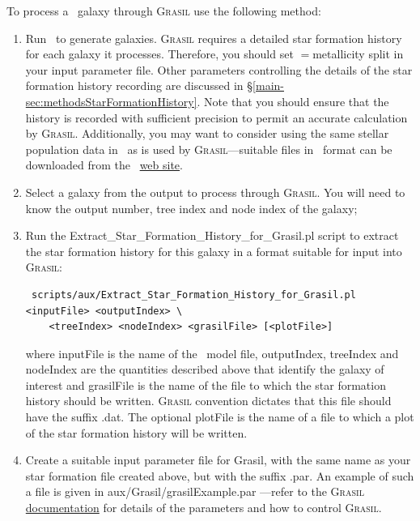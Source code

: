 To process a \glc\ galaxy through {\normalfont \scshape Grasil} use the following method:
\begin{enumerate}
 \item Run \glc\ to generate galaxies. {\normalfont \scshape Grasil} requires a detailed star formation history for each galaxy it processes. Therefore, you should set {\normalfont \ttfamily [starFormationHistoriesMethod]}$=${\normalfont \ttfamily metallicity split} in your input parameter file. Other parameters controlling the details of the star formation history recording are discussed in \S\ref{main-sec:methodsStarFormationHistory}. Note that you should ensure that the history is recorded with sufficient precision to permit an accurate calculation by {\normalfont \scshape Grasil}. Additionally, you may want to consider using the same stellar population data in \glc\ as is used by {\normalfont \scshape Grasil}---suitable files in \glc\ format can be downloaded from the \glc\ \href{https://sites.google.com/site/galacticusmodel/home/auxiliary-data}{web site}.
 \item Select a galaxy from the output to process through {\normalfont \scshape Grasil}. You will need to know the output number, tree index and node index of the galaxy;
 \item Run the {\normalfont \ttfamily Extract\_Star\_Formation\_History\_for\_Grasil.pl} script to extract the star formation history for this galaxy in a format suitable for input into {\normalfont \scshape Grasil}:
\begin{verbatim}
 scripts/aux/Extract_Star_Formation_History_for_Grasil.pl <inputFile> <outputIndex> \
    <treeIndex> <nodeIndex> <grasilFile> [<plotFile>]
\end{verbatim}
where {\normalfont \ttfamily inputFile} is the name of the \glc\ model file, {\normalfont \ttfamily outputIndex}, {\normalfont \ttfamily treeIndex} and {\normalfont \ttfamily nodeIndex} are the quantities described above that identify the galaxy of interest and {\normalfont \ttfamily grasilFile} is the name of the file to which the star formation history should be written. {\normalfont \scshape Grasil} convention dictates that this file should have the suffix {\normalfont \ttfamily .dat}. The optional {\normalfont \ttfamily plotFile} is the name of a file to which a plot of the star formation history will be written.
 \item Create a suitable input parameter file for {\normalfont \ttfamily Grasil}, with the same name as your star formation file created above, but with the suffix {\normalfont \ttfamily .par}. An example of such a file is given in {\normalfont \ttfamily aux/Grasil/grasilExample.par} ---refer to the {\normalfont \scshape Grasil} \href{http://adlibitum.oat.ts.astro.it/silva/grasil/grasil.doc}{documentation} for details of the parameters and how to control {\normalfont \scshape Grasil}. 

\end{enumerate}
